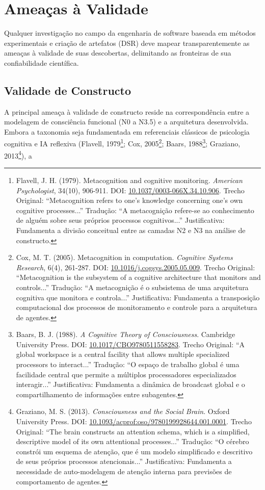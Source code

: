 \documentclass[12pt,a4paper,oneside]{abntex2}
\begin{document}
\section{Ameaças à Validade}

Qualquer investigação no campo da engenharia de software baseada em métodos experimentais e criação de artefatos (DSR) deve mapear transparentemente as ameaças à validade de suas descobertas, delimitando as fronteiras de sua confiabilidade científica.

\subsection{Validade de Constructo}

A principal ameaça à validade de constructo reside na correspondência entre a modelagem de consciência funcional (N0 a N3.5) e a arquitetura desenvolvida. Embora a taxonomia seja fundamentada em referenciais clássicos de psicologia cognitiva e IA reflexiva (Flavell, 1979\footnote{Flavell, J. H. (1979). Metacognition and cognitive monitoring. \textit{American Psychologist}, 34(10), 906-911. DOI: \href{https://doi.org/10.1037/0003-066X.34.10.906}{10.1037/0003-066X.34.10.906}. Trecho Original: ``Metacognition refers to one’s knowledge concerning one’s own cognitive processes...'' Tradução: ``A metacognição refere-se ao conhecimento de alguém sobre seus próprios processos cognitivos...'' Justificativa: Fundamenta a divisão conceitual entre as camadas N2 e N3 na análise de constructo.}; Cox, 2005\footnote{Cox, M. T. (2005). Metacognition in computation. \textit{Cognitive Systems Research}, 6(4), 261-287. DOI: \href{https://doi.org/10.1016/j.cogsys.2005.05.009}{10.1016/j.cogsys.2005.05.009}. Trecho Original: ``Metacognition is the subsystem of a cognitive architecture that monitors and controls...'' Tradução: ``A metacognição é o subsistema de uma arquitetura cognitiva que monitora e controla...'' Justificativa: Fundamenta a transposição computacional dos processos de monitoramento e controle para a arquitetura de agentes.}; Baars, 1988\footnote{Baars, B. J. (1988). \textit{A Cognitive Theory of Consciousness}. Cambridge University Press. DOI: \href{https://doi.org/10.1017/CBO9780511558283}{10.1017/CBO9780511558283}. Trecho Original: ``A global workspace is a central facility that allows multiple specialized processors to interact...'' Tradução: ``O espaço de trabalho global é uma facilidade central que permite a múltiplos processadores especializados interagir...'' Justificativa: Fundamenta a dinâmica de broadcast global e o compartilhamento de informações entre subagentes.}; Graziano, 2013\footnote{Graziano, M. S. (2013). \textit{Consciousness and the Social Brain}. Oxford University Press. DOI: \href{https://doi.org/10.1093/acprof:oso/9780199928644.001.0001}{10.1093/acprof:oso/9780199928644.001.0001}. Trecho Original: ``The brain constructs an attention schema, which is a simplified, descriptive model of its own attentional processes...'' Tradução: ``O cérebro constrói um esquema de atenção, que é um modelo simplificado e descritivo de seus próprios processos atencionais...'' Justificativa: Fundamenta a necessidade de auto-modelagem de atenção interna para previsões de comportamento de agentes.}), a 
\end{document}
